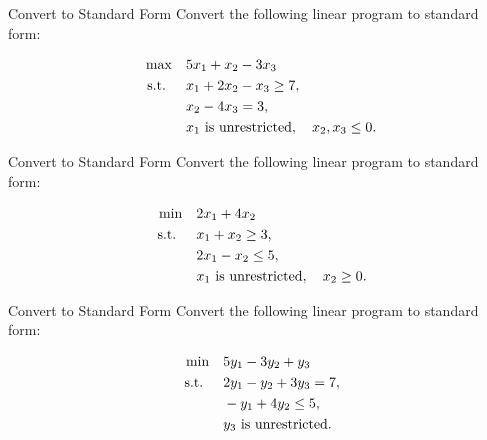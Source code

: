 \begin{ex}{Convert to Standard Form}{}
\label{ex:standard-form-3}
 Convert the following linear program to standard form:

\[
\begin{aligned}
    \max \quad & 5x_1 + x_2 - 3x_3 \\
    \text{ s.t. } \quad
    & x_1 + 2x_2 - x_3 \geq 7, \\
    & x_2 - 4x_3 = 3, \\
    & x_1 \text{ is unrestricted}, \quad x_2, x_3 \leq 0.
\end{aligned}
\]
\end{ex}

\begin{ex}{Convert to Standard Form}{}
\label{ex:84}
 Convert the following linear program to standard form:

\[
\begin{aligned}
    \min \quad & 2x_1 + 4x_2 \\
    \text{ s.t. } \quad
    & x_1 + x_2 \geq 3, \\
    & 2x_1 - x_2 \leq 5, \\
    & x_1 \text{ is unrestricted}, \quad x_2 \geq 0.
\end{aligned}
\]
\end{ex}

\begin{ex}{Convert to Standard Form}{}
\label{ex:85}
 Convert the following linear program to standard form:

\[
\begin{aligned}
    \min \quad & 5y_1 - 3y_2 + y_3 \\
    \text{ s.t. } \quad
    & 2y_1 - y_2 + 3y_3 = 7, \\
    & -y_1 + 4y_2 \leq 5, \\
    & y_3 \text{ is unrestricted}.
\end{aligned}
\]
\end{ex}


